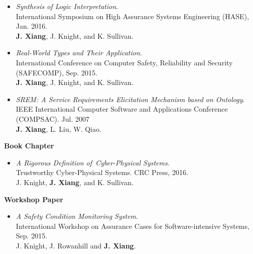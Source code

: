 \documentclass[11pt]{article}
\begin{document}
\begin{itemize}
\item \textit{Synthesis of Logic Interpretation}. \\ 
  International Symposium on High Assurance Systems Engineering (HASE), Jan. 2016. \\
  \textbf{J. Xiang}, J. Knight, and K. Sullivan.
  
\item \textit{Real-World Types and Their Application}. \\
  International Conference on Computer Safety, Reliability and Security (SAFECOMP), Sep. 2015. \\
  \textbf{J. Xiang}, J. Knight, and K. Sullivan.
  
\item \textit{SREM: A Service Requirements Elicitation Mechanism based on Ontology}. \\
  IEEE International Computer Software and Applications Conference (COMPSAC). Jul. 2007 \\
  \textbf{J. Xiang}, L. Liu, W. Qiao.  
\end{itemize}
    
    
\textbf{Book Chapter}

\begin{itemize}
\item \textit{A Rigorous Definition of Cyber-Physical Systems}. \\
  Trustworthy Cyber-Physical Systems. CRC Press, 2016.\\
  J. Knight, \textbf{J. Xiang}, and K. Sullivan. 
\end{itemize}




\textbf{Workshop Paper}
\begin{itemize}
\item
  \textit{A Safety Condition Monitoring System}. \\
  International Workshop on Assurance Cases for Software-intensive Systems, Sep. 2015. \\
  J. Knight, J. Rowanhill and \textbf{J. Xiang}.
\end{itemize}  
\end{document}
